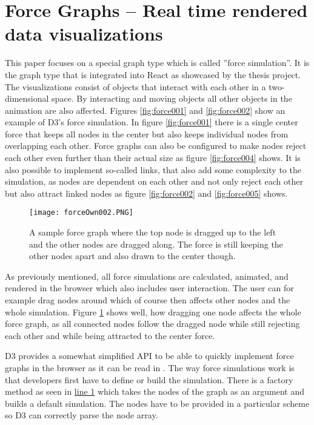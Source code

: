 \section{Force Graphs -- Real time rendered data visualizations}

This paper focuses on a special graph type which is called ''force simulation''. It is the graph type that is integrated into React as showcased by the thesis project. The visualizations consist of objects that interact with each other in a two-dimensional space. By interacting and moving objects all other objects in the animation are also affected. Figures \ref{fig:force001} and \ref{fig:force002} show an example of D3's force simulation. In figure \ref{fig:force001} there is a single center force that keeps all nodes in the center but also keeps individual nodes from overlapping each other. Force graphs can also be configured to make nodes reject each other even further than their actual size as figure \ref{fig:force004} shows. It is also possible to implement so-called links, that also add some complexity to the simulation, as nodes are dependent on each other and not only reject each other but also attract linked nodes as figure \ref{fig:force002} and \ref{fig:force005} shows.

\begin{figure}
    \centering
    \texttt{[image: forceOwn002.PNG]}
    \caption{A sample force graph where the top node is dragged up to the left and the other nodes are dragged along. The force is still keeping the other nodes apart and also drawn to the center though.}
    \label{fig:force003}
  \end{figure}

As previously mentioned, all force simulations are calculated, animated, and rendered in the browser which also includes user interaction. The user can for example drag nodes around which of course then affects other nodes and the whole simulation. Figure \ref{fig:force003} shows well, how dragging one node affects the whole force graph, as all connected nodes follow the dragged node while still rejecting each other and while being attracted to the center force.

D3 provides a somewhat simplified API to be able to quickly implement force graphs in the browser as it can be read in \cite[/d3-force/blob/master/README.md]{D3Github}. The way force simulations work is that developers first have to define or build the simulation. There is a factory method as seen in \hyperref[prog:simulation]{line 1} which takes the nodes of the graph as an argument and builds a default simulation. The nodes have to be provided in a particular scheme so D3 can correctly parse the node array. 

